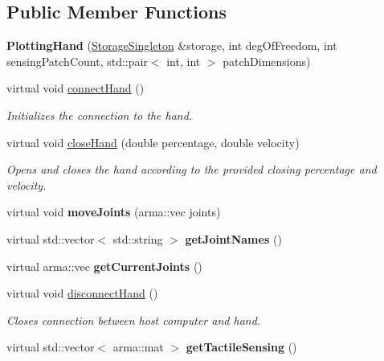 \subsection*{Public Member Functions}
\begin{DoxyCompactItemize}
\item 
{\bfseries Plotting\+Hand} (\hyperlink{classkukadu_1_1StorageSingleton}{Storage\+Singleton} \&storage, int deg\+Of\+Freedom, int sensing\+Patch\+Count, std\+::pair$<$ int, int $>$ patch\+Dimensions)\hypertarget{classkukadu_1_1PlottingHand_a9f4fcd793aac528a1eab0b5ae29d7bbd}{}\label{classkukadu_1_1PlottingHand_a9f4fcd793aac528a1eab0b5ae29d7bbd}

\item 
virtual void \hyperlink{classkukadu_1_1PlottingHand_ae1f5f384a2e8db0423b2a2ebe889f4f9}{connect\+Hand} ()
\begin{DoxyCompactList}\small\item\em Initializes the connection to the hand. \end{DoxyCompactList}\item 
virtual void \hyperlink{classkukadu_1_1PlottingHand_adcdc57d192c5dfca6ca154a50a904824}{close\+Hand} (double percentage, double velocity)
\begin{DoxyCompactList}\small\item\em Opens and closes the hand according to the provided closing percentage and velocity. \end{DoxyCompactList}\item 
virtual void {\bfseries move\+Joints} (arma\+::vec joints)\hypertarget{classkukadu_1_1PlottingHand_ad11dc6d53766e716d34b3f1ab04ed208}{}\label{classkukadu_1_1PlottingHand_ad11dc6d53766e716d34b3f1ab04ed208}

\item 
virtual std\+::vector$<$ std\+::string $>$ {\bfseries get\+Joint\+Names} ()\hypertarget{classkukadu_1_1PlottingHand_ac30028206b7a8151340094bd1e9d69a1}{}\label{classkukadu_1_1PlottingHand_ac30028206b7a8151340094bd1e9d69a1}

\item 
virtual arma\+::vec {\bfseries get\+Current\+Joints} ()\hypertarget{classkukadu_1_1PlottingHand_a366830e49be9050137852952bf269564}{}\label{classkukadu_1_1PlottingHand_a366830e49be9050137852952bf269564}

\item 
virtual void \hyperlink{classkukadu_1_1PlottingHand_a14fc064b6e159b0d7c7a9ce896bfa7d9}{disconnect\+Hand} ()
\begin{DoxyCompactList}\small\item\em Closes connection between host computer and hand. \end{DoxyCompactList}\item 
virtual std\+::vector$<$ arma\+::mat $>$ {\bfseries get\+Tactile\+Sensing} ()\hypertarget{classkukadu_1_1PlottingHand_a2110c545fc91f47ee9dd59fd1194ec01}{}\label{classkukadu_1_1PlottingHand_a2110c545fc91f47ee9dd59fd1194ec01}


\end{DoxyCompactItemize}

